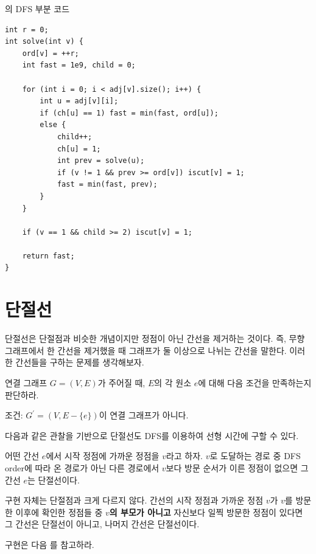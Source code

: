 \begin{code} \label{code: articulation-point}
의 DFS 부분 코드
\begin{lstlisting}
int r = 0;
int solve(int v) {
    ord[v] = ++r;
    int fast = 1e9, child = 0;
    
    for (int i = 0; i < adj[v].size(); i++) {
        int u = adj[v][i];
        if (ch[u] == 1) fast = min(fast, ord[u]);
        else {
            child++;
            ch[u] = 1;
            int prev = solve(u);
            if (v != 1 && prev >= ord[v]) iscut[v] = 1;
            fast = min(fast, prev);
        }
    }
    
    if (v == 1 && child >= 2) iscut[v] = 1;
    
    return fast;
}
\end{lstlisting}
\end{code}

\section{단절선}
단절선은 단절점과 비슷한 개념이지만 정점이 아닌 간선을 제거하는 것이다. 즉, 무향 그래프에서 한 간선을 제거했을 때 그래프가 둘 이상으로 나뉘는 간선을 말한다. 이러한 간선들을 구하는 문제를 생각해보자.

\begin{example} \label{ex: articulation-bridge}
    연결 그래프 $G=(V, E)$가 주어질 때, $E$의 각 원소 $e$에 대해 다음 조건을 만족하는지 판단하라.

    조건: $G^\prime = (V, E - \{ e \})$이 연결 그래프가 아니다.
\end{example}

다음과 같은 관찰을 기반으로 단절선도 DFS를 이용하여 선형 시간에 구할 수 있다.

\begin{obs}
    어떤 간선 $e$에서 시작 정점에 가까운 정점을 $v$라고 하자. $v$로 도달하는 경로 중 DFS order에 따라 온 경로가 아닌 다른 경로에서 $v$보다 방문 순서가 이른 정점이 없으면 그 간선 $e$는 단절선이다.
\end{obs}

구현 자체는 단절점과 크게 다르지 않다. 간선의 시작 정점과 가까운 정점 $v$가 $v$를 방문한 이후에 확인한 정점들 중 \textbf{$v$의 부모가 아니고} 자신보다 일찍 방문한 정점이 있다면 그 간선은 단절선이 아니고, 나머지 간선은 단절선이다.

구현은 다음 를 참고하라.

